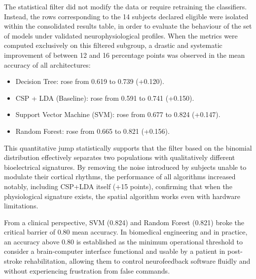 \documentclass[12pt,a4paper]{article}
\begin{document}
The statistical filter did not modify the data or require retraining the classifiers. Instead,
the rows corresponding to the 14 subjects declared eligible were isolated within the
consolidated results table, in order to evaluate the behaviour of the set of models under
validated neurophysiological profiles. When the metrics were computed exclusively on this
filtered subgroup, a drastic and systematic improvement of between 12 and 16 percentage points
was observed in the mean accuracy of all architectures:
\begin{itemize}[label=\textbullet, leftmargin=1.3cm]
  \item Decision Tree: rose from 0.619 to 0.739 (+0.120).
  \item CSP + LDA (Baseline): rose from 0.591 to 0.741 (+0.150).
  \item Support Vector Machine (SVM): rose from 0.677 to 0.824 (+0.147).
  \item Random Forest: rose from 0.665 to 0.821 (+0.156).
\end{itemize}

This quantitative jump statistically supports that the filter based on the binomial
distribution effectively separates two populations with qualitatively different bioelectrical
signatures. By removing the noise introduced by subjects unable to modulate their cortical
rhythms, the performance of all algorithms increased notably, including CSP+LDA itself
(+15 points), confirming that when the physiological signature exists, the spatial algorithm
works even with hardware limitations.

From a clinical perspective, SVM (0.824) and Random Forest (0.821) broke the critical barrier of
0.80 mean accuracy. In biomedical engineering and in practice, an accuracy above 0.80 is
established as the minimum operational threshold to consider a brain-computer interface
functional and usable by a patient in post-stroke rehabilitation, allowing them to control
neurofeedback software fluidly and without experiencing frustration from false commands.
\end{document}

